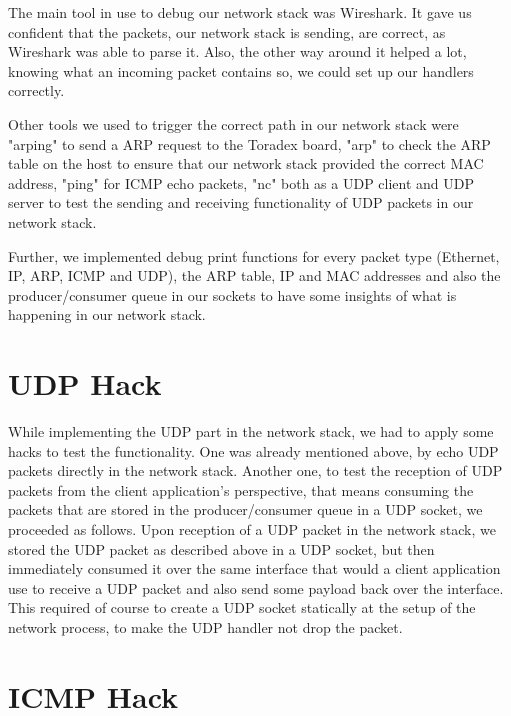 The main tool in use to debug our network stack was Wireshark. It gave us
confident that the packets, our network stack is sending, are correct, as
Wireshark was able to parse it. Also, the other way around it helped a lot,
knowing what an incoming packet contains so, we could set up our handlers
correctly.

Other tools we used to trigger the correct path in our network stack were
"arping" to send a ARP request to the Toradex board, "arp" to check the ARP
table on the host to ensure that our network stack provided the correct MAC
address, "ping" for ICMP echo packets, "nc" both as a UDP client and UDP server
to test the sending and receiving functionality of UDP packets in our network
stack.

Further, we implemented debug print functions for every packet type (Ethernet,
IP, ARP, ICMP and UDP), the ARP table, IP and MAC addresses and also the
producer/consumer queue in our sockets to have some insights of what is
happening in our network stack.

\section{UDP Hack}

While implementing the UDP part in the network stack, we had to apply some hacks
to test the functionality. One was already mentioned above, by echo UDP packets
directly in the network stack.  Another one, to test the reception of UDP
packets from the client application's perspective, that means consuming the
packets that are stored in the producer/consumer queue in a UDP socket, we
proceeded as follows. Upon reception of a UDP packet in the network stack, we
stored the UDP packet as described above in a UDP socket, but then immediately
consumed it over the same interface that would a client application use to
receive a UDP packet and also send some payload back over the interface. This
required of course to create a UDP socket statically at the setup of the network
process, to make the UDP handler not drop the packet.

\section{ICMP Hack}

